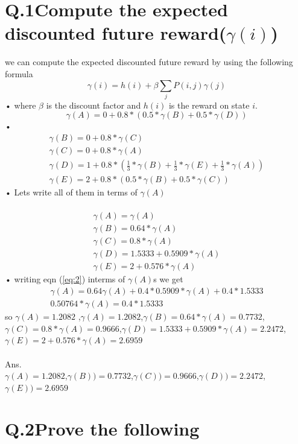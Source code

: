 \documentclass[a4paper,11pt]{article}
\begin{document}
\section*{Q.1\quad Compute the expected discounted future reward($\gamma (i)$)}
we can compute the expected discounted future reward by using the following formula
\begin{equation}
\gamma(i) = h(i) + \beta \sum_{j}P(i,j)\gamma(j)
\end{equation}•
where $\beta$ is the discount factor and $h(i)$ is the reward on state $i$.
\begin{equation}\label{eq:2}
\gamma(A) = 0 +  0.8*(0.5*\gamma(B)+0.5*\gamma(D))
\end{equation}•
\begin{eqnarray}
\gamma(B) = 0 +  0.8*\gamma(C)\\
\gamma(C) = 0 +  0.8*\gamma(A)\\
\gamma(D) = 1 +  0.8*(\frac{1}{3}*\gamma(B)+\frac{1}{3}*\gamma(E)+\frac{1}{3}*\gamma(A))\\
\gamma(E) = 2 +  0.8*(0.5*\gamma(B)+0.5*\gamma(C))
\end{eqnarray}•
Lets write all of them in terms of  $\gamma(A)$\\\\
\begin{eqnarray}
\gamma(A) = \gamma(A)\\
\gamma(B) = 0.64*\gamma(A)\\
\gamma(C) = 0.8*\gamma(A)\\
\gamma(D) = 1.5333+0.5909*\gamma(A)\\
\gamma(E) = 2+0.576*\gamma(A)
\end{eqnarray}•
writing eqn (\ref{eq:2}) interms of $\gamma(A)$s we get \\
\begin{eqnarray}
\gamma(A) = 0.64\gamma(A) + 0.4*0.5909*\gamma(A) + 0.4*1.5333\\
0.50764*\gamma(A) = 0.4*1.5333
\end{eqnarray}
so $\gamma(A)=1.2082$ ,$\gamma(A)=1.2082$,\quad $\gamma(B)=0.64*\gamma(A)=0.7732$,\\ \quad$\gamma(C)=0.8*\gamma(A)=0.9666$,\quad$\gamma(D)=1.5333+0.5909*\gamma(A)=2.2472$,\quad$\gamma(E)=2+0.576*\gamma(A)=2.6959$\\\\
Ans.\\
$\gamma(A)=1.2082$,\quad $\gamma(B))=0.7732$,\quad $\gamma(C))=0.9666$,\quad $\gamma(D))=2.2472$,\quad $\gamma(E))=2.6959$
\newpage
\section*{Q.2\quad Prove the following}
\end{document}
